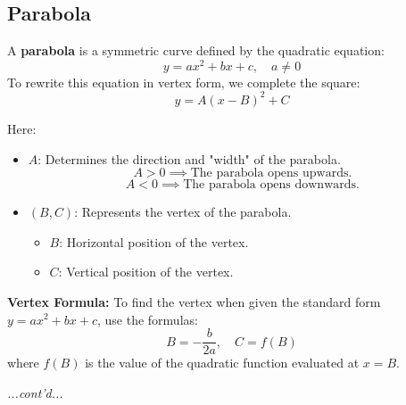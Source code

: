 \documentclass{article}
\begin{document}
\subsection*{Parabola}

\begin{definitionbox}
A \textbf{parabola} is a symmetric curve defined by the quadratic equation:  
\[
    y = ax^2 + bx + c, \quad a \neq 0
\]
To rewrite this equation in vertex form, we complete the square:  
\[
    y = A(x - B)^2 + C
\]

Here:  
\begin{itemize}
    \item \( A \): Determines the direction and "width" of the parabola.  
    \[
        A > 0 \implies \text{The parabola opens upwards.}
    \]  
    \[
        A < 0 \implies \text{The parabola opens downwards.}
    \]
    \item \( (B, C) \): Represents the vertex of the parabola.
    \begin{itemize} 
        \item[\labelitemi] \( B \): Horizontal position of the vertex.  
        \item[\labelitemi] \( C \): Vertical position of the vertex.
    \end{itemize} 
\end{itemize}

\begin{algorithmbox}

    \textbf{Vertex Formula:}  
    To find the vertex when given the standard form \( y = ax^2 + bx + c \), use the formulas:  
    \[
        B = -\frac{b}{2a}, \quad C = f(B)
    \]
    where \( f(B) \) is the value of the quadratic function evaluated at \( x = B \).
\end{algorithmbox}
\textit{...cont'd...}
\end{definitionbox}
\end{document}
